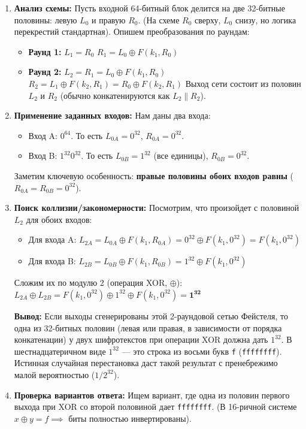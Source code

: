 ﻿\documentclass[9pt,a4paper]{extarticle}
\newcommand{\tightlist}{}
\begin{document}
\begin{enumerate}
\def\labelenumi{\arabic{enumi}.}
\item
  \textbf{Анализ схемы:} Пусть входной 64-битный блок делится на две 32-битные половины: левую \(L_0\) и правую \(R_0\). (На схеме \(R_0\) сверху, \(L_0\) снизу, но логика перекрестий стандартная). Опишем преобразования по раундам:

  \begin{itemize}
  \tightlist
  \item
    \textbf{Раунд 1:} \(L_1 = R_0\) \(R_1 = L_0 \oplus F(k_1, R_0)\)
  \item
    \textbf{Раунд 2:} \(L_2 = R_1 = L_0 \oplus F(k_1, R_0)\) \(R_2 = L_1 \oplus F(k_2, R_1) = R_0 \oplus F(k_2, R_1)\) Выход сети состоит из половин \(L_2\) и \(R_2\) (обычно конкатенируются как \(L_2 \parallel R_2\)).
  \end{itemize}
\item
  \textbf{Применение заданных входов:} Нам даны два входа:

  \begin{itemize}
  \tightlist
  \item
    Вход A: \(0^{64}\). То есть \(L_{0A} = 0^{32}\), \(R_{0A} = 0^{32}\).
  \item
    Вход B: \(1^{32}0^{32}\). То есть \(L_{0B} = 1^{32}\) (все единицы), \(R_{0B} = 0^{32}\).
  \end{itemize}

  Заметим ключевую особенность: \textbf{правые половины обоих входов равны} (\(R_{0A} = R_{0B} = 0^{32}\)).
\item
  \textbf{Поиск коллизии/закономерности:} Посмотрим, что произойдет с половиной \(L_2\) для обоих входов:

  \begin{itemize}
  \tightlist
  \item
    Для входа A: \(L_{2A} = L_{0A} \oplus F(k_1, R_{0A}) = 0^{32} \oplus F(k_1, 0^{32}) = F(k_1, 0^{32})\)
  \item
    Для входа B: \(L_{2B} = L_{0B} \oplus F(k_1, R_{0B}) = 1^{32} \oplus F(k_1, 0^{32})\)
  \end{itemize}

  Сложим их по модулю 2 (операция XOR, \(\oplus\)): \(L_{2A} \oplus L_{2B} = F(k_1, 0^{32}) \oplus 1^{32} \oplus F(k_1, 0^{32}) = \mathbf{1^{32}}\)

  \textbf{Вывод:} Если выходы сгенерированы этой 2-раундовой сетью Фейстеля, то одна из 32-битных половин (левая или правая, в зависимости от порядка конкатенации) у двух шифротекстов при операции XOR должна дать \(1^{32}\). В шестнадцатеричном виде \(1^{32}\) --- это строка из восьми букв \texttt{f} (\texttt{ffffffff}). Истинная случайная перестановка даст такой результат с пренебрежимо малой вероятностью (\(1/2^{32}\)).
\item
  \textbf{Проверка вариантов ответа:} Ищем вариант, где одна из половин первого выхода при XOR со второй половиной дает \texttt{ffffffff}. (В 16-ричной системе \(x \oplus y = f \implies\) биты полностью инвертированы).


\end{enumerate}
\end{document}
